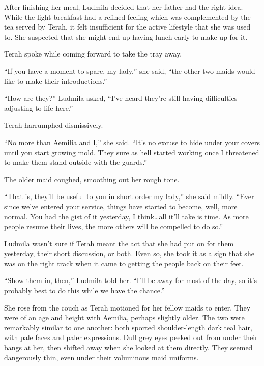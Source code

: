  

After finishing her meal, Ludmila decided that her father had the right idea. While the light breakfast had a refined feeling which was complemented by the tea served by Terah, it felt insufficient for the active lifestyle that she was used to. She suspected that she might end up having lunch early to make up for it.

 

Terah spoke while coming forward to take the tray away.

 

“If you have a moment to spare, my lady,” she said, “the other two maids would like to make their introductions.”

 

“How are they?” Ludmila asked, “I’ve heard they’re still having difficulties adjusting to life here.”

 

Terah harrumphed dismissively.

 

“No more than Aemilia and I,” she said. “It’s no excuse to hide under your covers until you start growing mold. They sure as hell started working once I threatened to make them stand outside with the guards.”

 

The older maid coughed, smoothing out her rough tone.

 

“That is, they’ll be useful to you in short order my lady,” she said mildly. “Ever since we’ve entered your service, things have started to become, well, more normal. You had the gist of it yesterday, I think…all it’ll take is time. As more people resume their lives, the more others will be compelled to do so.”

 

Ludmila wasn’t sure if Terah meant the act that she had put on for them yesterday, their short discussion, or both. Even so, she took it as a sign that she was on the right track when it came to getting the people back on their feet.

 

“Show them in, then,” Ludmila told her. “I’ll be away for most of the day, so it’s probably best to do this while we have the chance.”

 

She rose from the couch as Terah motioned for her fellow maids to enter. They were of an age and height with Aemilia, perhaps slightly older. The two were remarkably similar to one another: both sported shoulder-length dark teal hair, with pale faces and paler expressions. Dull grey eyes peeked out from under their bangs at her, then shifted away when she looked at them directly. They seemed dangerously thin, even under their voluminous maid uniforms.

